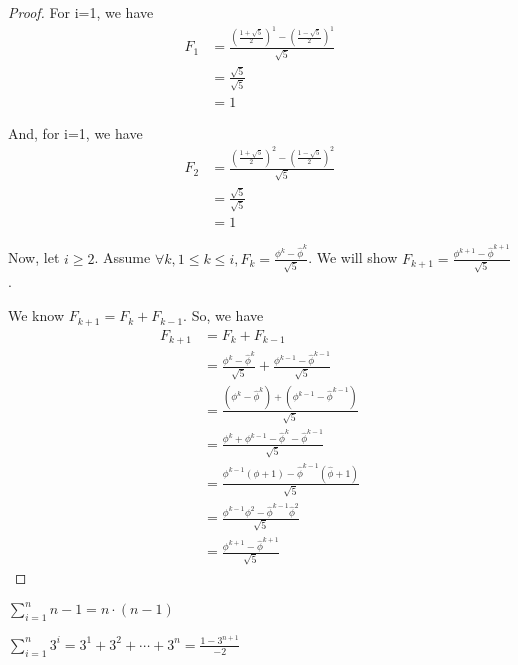 \documentclass[10pt,letterpaper]{amspset}
\theoremstyle{definition}
\theoremstyle{remark}
\numberwithin{subcase}{case}
\numberwithin{equation}{section}
\begin{document}
\begin{solution}
\begin{proof}
For i=1, we have
\begin{align*}
F_1 &= \frac{\left(\frac{1+\sqrt{5}}{2}\right)^1 - \left(\frac{1-\sqrt{5}}{2}\right)^1}{\sqrt{5}} \\
{} &= \frac{\sqrt{5}}{\sqrt{5}} \\
{} &= 1
\end{align*}

And, for i=1, we have
\begin{align*}
F_2 &= \frac{\left(\frac{1+\sqrt{5}}{2}\right)^2 - \left(\frac{1-\sqrt{5}}{2}\right)^2}{\sqrt{5}} \\
{} &= \frac{\sqrt{5}}{\sqrt{5}} \\
{} &= 1
\end{align*}

Now, let $i \geq 2$.  Assume $\forall k, 1 \leq k \leq i, F_k = \frac{\phi^k - \hat{\phi}^k}{\sqrt{5}}$.  We will show $F_{k+1} = \frac{\phi^{k+1} - \hat{\phi}^{k+1}}{\sqrt{5}}$.

We know $F_{k+1} = F_k + F_{k-1}$.  So, we have
\begin{align*}
F_{k+1} &= F_k + F_{k-1} \\
{} &= \frac{\phi^k - \hat{\phi}^k}{\sqrt{5}} + \frac{\phi^{k-1} - \hat{\phi}^{k-1}}{\sqrt{5}}\\
{} &= \frac{\left(\phi^k - \hat{\phi}^k\right) + \left(\phi^{k-1} - \hat{\phi}^{k-1}\right)}{\sqrt{5}} \\
{} &= \frac{\phi^k + \phi^{k-1} - \hat{\phi}^k - \hat{\phi}^{k-1}}{\sqrt{5}} \\
{} &= \frac{\phi^{k-1}(\phi + 1) - \hat{\phi}^{k-1}(\hat{\phi}+1)}{\sqrt{5}} \\
{} &= \frac{\phi^{k-1}\phi^2 - \hat{\phi}^{k-1}\hat{\phi}^2}{\sqrt{5}} \\
{} &= \frac{\phi^{k+1} - \hat{\phi}^{k+1}}{\sqrt{5}}
\end{align*}

\end{proof}
\end{solution}

\begin{problem}[13]
$\sum_{i=1}^{n} n-1 = n \cdot (n-1)$
\end{problem}

\begin{problem}[14]
$\sum_{i=1}^{n} 3^i = 3^1 + 3^2 + \dotsb + 3^n = \frac{1-3^{n+1}}{-2}$
\end{problem}
\end{document}
